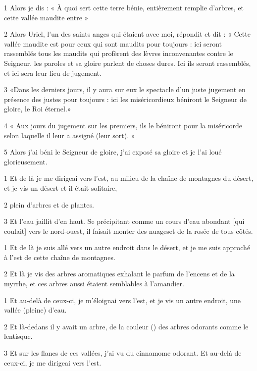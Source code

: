 
\par 1 Alors je dis : « À quoi sert cette terre bénie, entièrement remplie d’arbres, et cette vallée maudite entre »
\par 2 Alors Uriel, l'un des saints anges qui étaient avec moi, répondit et dit : « Cette vallée maudite est pour ceux qui sont maudits pour toujours : ici seront rassemblés tous les maudits qui profèrent des lèvres inconvenantes contre le Seigneur. les paroles et sa gloire parlent de choses dures. Ici ils seront rassemblés, et ici sera leur lieu de jugement.
\par 3 «Dans les derniers jours, il y aura sur eux le spectacle d'un juste jugement en présence des justes pour toujours : ici les miséricordieux béniront le Seigneur de gloire, le Roi éternel.»
\par 4 « Aux jours du jugement sur les premiers, ils le béniront pour la miséricorde selon laquelle il leur a assigné (leur sort). »
\par 5 Alors j'ai béni le Seigneur de gloire, j'ai exposé sa gloire et je l'ai loué glorieusement.


\par 1 Et de là je me dirigeai vers l'est, au milieu de la chaîne de montagnes du désert, et je vis un désert et il était solitaire,
\par 2 plein d'arbres et de plantes.
\par 3 Et l'eau jaillit d'en haut. Se précipitant comme un cours d'eau abondant [qui coulait] vers le nord-ouest, il faisait monter des nuages ​​et de la rosée de tous côtés.


\par 1 Et de là je suis allé vers un autre endroit dans le désert, et je me suis approché à l'est de cette chaîne de montagnes.
\par 2 Et là je vis des arbres aromatiques exhalant le parfum de l'encens et de la myrrhe, et ces arbres aussi étaient semblables à l'amandier.


\par 1 Et au-delà de ceux-ci, je m'éloignai vers l'est, et je vis un autre endroit, une vallée (pleine) d'eau.
\par 2 Et là-dedans il y avait un arbre, de la couleur () des arbres odorants comme le lentisque.
\par 3 Et sur les flancs de ces vallées, j'ai vu du cinnamome odorant. Et au-delà de ceux-ci, je me dirigeai vers l'est.


